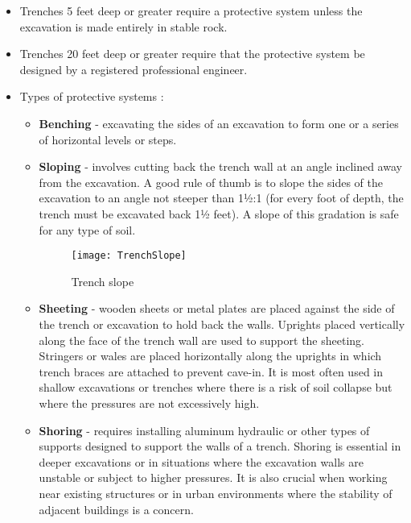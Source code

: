 \begin{itemize}
\begin{enumerate}
\begin{itemize}
\item Trenches 5 feet deep or greater require a protective system unless the excavation is made entirely in stable rock.
\item Trenches 20 feet deep or greater require that the protective system be designed by a registered professional engineer.
\item Types of protective systems :
\begin{itemize}
\item \textbf{Benching}  - excavating the sides of an excavation to form one or a series of horizontal levels or steps.
\item \textbf{Sloping}  - involves cutting back the trench wall at an angle inclined away from the excavation.  A good rule of thumb is to slope the sides of the excavation to an angle not steeper
than 1½:1 (for every foot of depth, the trench must be excavated back 1½ feet). A slope of this gradation is safe for any type of soil.
\begin{figure}[H]
\begin{center}
\texttt{[image: TrenchSlope]}
\caption{Trench slope}
\end{center}
\end{figure}
\item \textbf{Sheeting}  - wooden sheets or metal plates are placed against the side of the trench or excavation to hold back the walls. Uprights placed vertically along the face of the trench wall are used to support the sheeting. Stringers or wales are placed horizontally along the uprights in which trench braces are attached to prevent cave-in.  It is most often used in shallow excavations or trenches where there is a risk of soil collapse but where the pressures are not excessively high.
\item \textbf{Shoring}  - requires installing aluminum hydraulic or other types of supports designed to support the walls of a trench. Shoring is essential in deeper excavations or in situations where the excavation walls are unstable or subject to higher pressures. It is also crucial when working near existing structures or in urban environments where the stability of adjacent buildings is a concern.

\end{itemize}
\end{itemize}
\end{enumerate}
\end{itemize}
